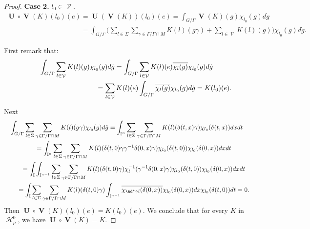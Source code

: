 \documentclass[11pt]{article}
\DeclareMathOperator{\U}{\mathbf{U}}
\DeclareMathOperator{\V}{\mathbf{V}} \DeclareMathOperator{\Aut}{Aut}
\DeclareMathOperator{\nongen}{\mathcal{V}}
\DeclareMathOperator{\Hi}{\mathscr{H}}
\def\tore{{\mathbb I}}
\begin{document}
\begin{proof}
 \textbf{Case 2.}   $l_0\in \nongen$.
\begin{gather*}
\U\circ \V(K)(l_0)(e)  = \U( \V(K))(l_0)(e) = \int_{G/ \Gamma} \V(K)(g) \chi_{l_0}(g) d\dot{g}\\
\phantom{\U\circ \V(K)(l_0)(e)}{} = \int_{G/ \Gamma}\Bigg( \sum_{l\in \Sigma} \sum_{\gamma\in
\Gamma/\Gamma\cap M} K(l)(g\gamma)+ \sum _{l\in \nongen} K(l)
(g)\Bigg) \chi_{l_0}(g) d\dot{g}.
\end{gather*}

First remark that:
\begin{gather*}
\int_{G/ \Gamma}   \sum_{l\in \nongen} K(l) (g) \chi_{l_0}(g)
d\dot{g}  = \int_{G/ \Gamma} \sum_{l\in \nongen}
K(l) (e) \overline{\chi_{l}(g)} \chi_{l_0}(g )d\dot{g}\\
\hphantom{\int_{G/ \Gamma}   \sum_{l\in \nongen} K(l) (g) \chi_{l_0}(g) d\dot{g} }{}
 =  \sum_{l\in \nongen} K(l) (e) \int_{G/ \Gamma}
\overline{\chi_{l}(g)} \chi_{l_0}(g)
 d\dot{g}
  = K(l_0)(e).
\end{gather*}

Next
\begin{gather*}
 \int_{G/ \Gamma}  \sum_{l\in \Sigma} \sum_{\gamma\in
\Gamma/ \Gamma\cap M} K(l)(g \gamma)\chi_{l_0}(g) d\dot{g}
 =
\int_{\tore^n}  \sum_{l\in \Sigma} \sum_{\gamma\in \Gamma/
\Gamma\cap M} K(l)(\delta(t, x)\gamma) \chi_{l_0}(\delta(t, x))
dx dt \\
 \qquad {} =  \int_{\tore^n}  \sum_{l\in \Sigma} \sum_{\gamma\in \Gamma/
\Gamma\cap M} K(l)(\delta(t, 0)\gamma \gamma^{-1}
\delta(0,x)\gamma)\chi_{l_0}(\delta(t, 0))
 \chi_{l_0}(\delta(0, x)) dx dt\\
\qquad {} =  \int_\tore \int_{\tore^{n-1}}  \sum_{l\in \Sigma}
\sum_{\gamma\in \Gamma/\Gamma\cap M} K(l)(\delta(t, 0)\gamma)
\chi_l^{-1}(\gamma^{-1} \delta(0,x)\gamma) \chi_{l_0}(\delta(t,
0))\chi_{l_0}(\delta(0, x)) dx dt\\
\qquad{} =  \int_\tore  \sum_{l\in \Sigma} \sum_{\gamma\in
\Gamma/\Gamma\cap M}
K(l)(\delta(t,0)\gamma)\int_{\tore^{n-1}}\overline{\chi_{\Ad^*\gamma
l}(\delta(0, x))} \chi_{l_0}(\delta(0, x)) dx \chi_{l_0}(\delta(t,
0))dt =0.
\end{gather*}
Then $\U\circ\V (K)(l_0)(e)\! =\! K(l_0)(e)$.
We conclude that for every $K$ in $\Hi_\rho^0$, we have $\U\circ\V
(K)\! =\! K $.



\end{proof}
\end{document}
